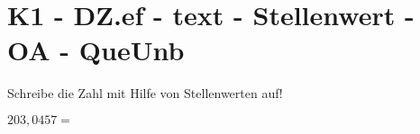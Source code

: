 \section{K1 - DZ.ef - text - Stellenwert - OA - QueUnb}

\begin{beispiel}{0} %
				Schreibe die Zahl mit Hilfe von Stellenwerten auf!\leer
					
					$203,0457=$ 
\end{beispiel}